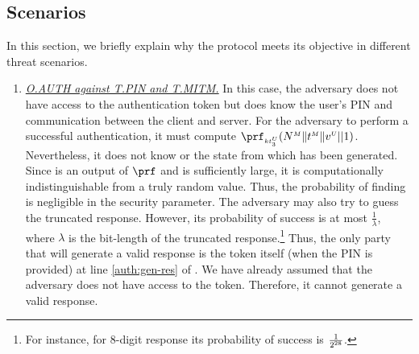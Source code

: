 \subsection{Scenarios}
In this section, we briefly explain why the protocol meets its objective in different threat scenarios. 

\begin{enumerate}[leftmargin=5.5mm]

\item\underline{\textit{O.AUTH against 
T.PIN and T.MITM.}}  In this case, the adversary does not have
access to the authentication token but does know the user's PIN and communication between the client and server.  For the adversary to perform a successful authentication, it must compute $\prf_{\sss\VC{\keyt_{\sss 3}}}(\VM{\nonce} \|  \VM{\trans} \| \VC{\verifier}|| 1)$. Nevertheless, it does not know  or the state from which  has been generated. Since   is an output of $\prf$ and is sufficiently large, it is computationally indistinguishable from a truly random value. Thus,  the probability of finding  is negligible in the security parameter.  The adversary may also try to guess the truncated response. However, its probability of success is at most $\frac{1}{\lambda}$, where $\lambda$ is the bit-length of the truncated response.\footnote{For instance, for $8$-digit response its probability of success is $\frac{1}{2^{\scriptscriptstyle 28}}$.}  
%
Thus, the only party that will generate a valid response is the token itself (when the PIN is provided) at line \ref{auth:gen-res} of .  We have already assumed that the adversary does not have access to the token. Therefore, it cannot generate a valid response.%


\end{enumerate}
